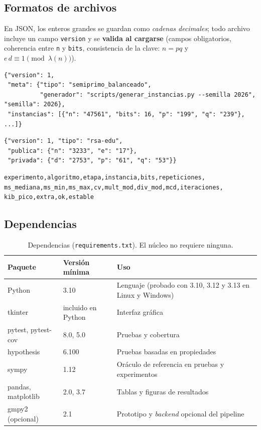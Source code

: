 \subsection{Formatos de archivos}

En JSON, los enteros grandes se guardan como \emph{cadenas decimales}; todo
archivo incluye un campo \texttt{version} y se \textbf{valida al cargarse}
(campos obligatorios, coherencia entre \texttt{n} y \texttt{bits}, consistencia
de la clave: $n = pq$ y $e\,d \equiv 1 \pmod{\lambda(n)}$).

\begin{lstlisting}[style=datos, caption={Instancias (\texttt{data/instancias/semiprimos.json}, extracto real).}]
{"version": 1,
 "meta": {"tipo": "semiprimo_balanceado",
          "generador": "scripts/generar_instancias.py --semilla 2026", "semilla": 2026},
 "instancias": [{"n": "47561", "bits": 16, "p": "199", "q": "239"}, ...]}
\end{lstlisting}

\begin{lstlisting}[style=datos, caption={Par de claves (\texttt{clave.json}, generado por la CLI).}]
{"version": 1, "tipo": "rsa-edu",
 "publica": {"n": "3233", "e": "17"},
 "privada": {"d": "2753", "p": "61", "q": "53"}}
\end{lstlisting}

\begin{lstlisting}[style=datos, caption={Resultados (\texttt{resultados/<configuración>/E1.csv} \dots{} \texttt{E6.csv}): columnas.}]
experimento,algoritmo,etapa,instancia,bits,repeticiones,
ms_mediana,ms_min,ms_max,cv,mult_mod,div_mod,mcd,iteraciones,
kib_pico,extra,ok,estable
\end{lstlisting}

\subsection{Dependencias}

\begin{table}[H]
\centering\small
\caption{Dependencias (\texttt{requirements.txt}). El núcleo no requiere ninguna.}
\begin{tabularx}{\textwidth}{@{}l l Y@{}}
\toprule
\textbf{Paquete} & \textbf{Versión mínima} & \textbf{Uso}\\
\midrule
Python & 3.10 & Lenguaje (probado con 3.10, 3.12 y 3.13 en Linux y Windows)\\
tkinter & incluido en Python & Interfaz gráfica\\
pytest, pytest-cov & 8.0, 5.0 & Pruebas y cobertura\\
hypothesis & 6.100 & Pruebas basadas en propiedades\\
sympy & 1.12 & Oráculo de referencia en pruebas y experimentos\\
pandas, matplotlib & 2.0, 3.7 & Tablas y figuras de resultados\\
gmpy2 (opcional) & 2.1 & Prototipo y \emph{backend} opcional del pipeline\\
\bottomrule
\end{tabularx}
\end{table}

